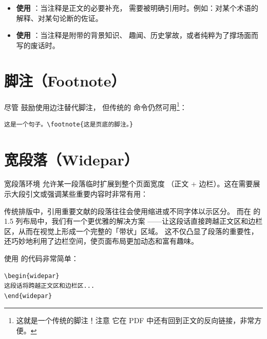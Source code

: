 \begin{kaobox}[title=何时使用哪种？]
\begin{itemize}
    \item \textbf{使用 }：当注释是正文的必要补充，
        需要被明确引用时。例如：对某个术语的解释、对某句论断的佐证。
    \item \textbf{使用 }：当注释是附带的背景知识、
        趣闻、历史掌故，或者纯粹为了撑场面而写的废话时。
\end{itemize}
\end{kaobox}

\section{脚注（Footnote）}

尽管  鼓励使用边注替代脚注，
但传统的  命令仍然可用\footnote{这就是一个传统的脚注！注意
它在 PDF 中还有回到正文的反向链接，非常方便。}：

\begin{lstlisting}[style=kaolstplain, caption=传统脚注]
这是一个句子。\footnote{这是页底的脚注。}
\end{lstlisting}


\section{宽段落（Widepar）}

宽段落环境  允许某一段落临时扩展到整个页面宽度
（正文 + 边栏）。这在需要展示大段引文或强调某些重要内容时非常有用：

\begin{widepar}
传统排版中，引用重要文献的段落往往会使用缩进或不同字体以示区分。
而在  的 1.5 列布局中，我们有一个更优雅的解决方案
——让这段话直接跨越正文区和边栏区，从而在视觉上形成一个完整的「带状」区域。
这不仅凸显了段落的重要性，还巧妙地利用了边栏空间，使页面布局更加动态和富有趣味。
\end{widepar}

使用  的代码非常简单：

\begin{lstlisting}[style=kaolstplain, caption=宽段落]
\begin{widepar}
这段话将跨越正文区和边栏区...
\end{widepar}
\end{lstlisting}

